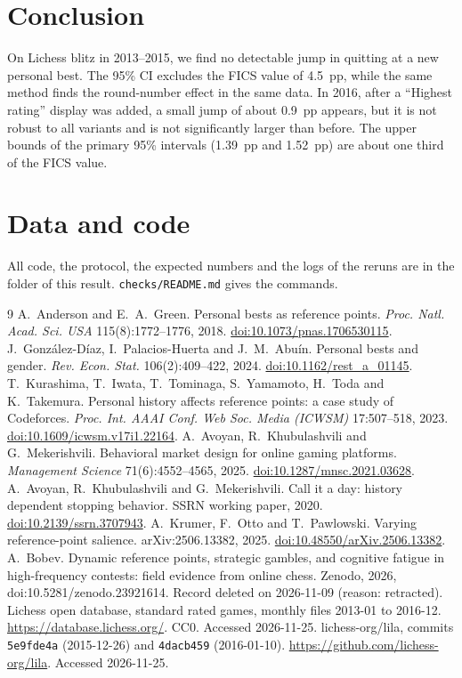 \documentclass[11pt]{article}
\begin{document}
\section{Conclusion}

On Lichess blitz in 2013--2015, we find no detectable jump in quitting at a new personal best. The 95\% CI excludes the FICS value of 4.5~pp, while the same method finds the round-number effect in the same data. In 2016, after a ``Highest rating'' display was added, a small jump of about 0.9~pp appears, but it is not robust to all variants and is not significantly larger than before. The upper bounds of the primary 95\% intervals (1.39~pp and 1.52~pp) are about one third of the FICS value.

\section*{Data and code}

All code, the protocol, the expected numbers and the logs of the reruns are in the folder of this result. \texttt{checks/README.md} gives the commands.

\begin{thebibliography}{9}
 A.~Anderson and E.~A.~Green. Personal bests as reference points. \emph{Proc. Natl. Acad. Sci. USA} 115(8):1772--1776, 2018. \href{https://doi.org/10.1073/pnas.1706530115}{doi:10.1073/pnas.1706530115}.
 J.~González-Díaz, I.~Palacios-Huerta and J.~M.~Abuín. Personal bests and gender. \emph{Rev. Econ. Stat.} 106(2):409--422, 2024. \href{https://doi.org/10.1162/rest_a_01145}{doi:10.1162/rest\_a\_01145}.
 T.~Kurashima, T.~Iwata, T.~Tominaga, S.~Yamamoto, H.~Toda and K.~Takemura. Personal history affects reference points: a case study of Codeforces. \emph{Proc. Int. AAAI Conf. Web Soc. Media (ICWSM)} 17:507--518, 2023. \href{https://doi.org/10.1609/icwsm.v17i1.22164}{doi:10.1609/icwsm.v17i1.22164}.
 A.~Avoyan, R.~Khubulashvili and G.~Mekerishvili. Behavioral market design for online gaming platforms. \emph{Management Science} 71(6):4552--4565, 2025. \href{https://doi.org/10.1287/mnsc.2021.03628}{doi:10.1287/mnsc.2021.03628}.
 A.~Avoyan, R.~Khubulashvili and G.~Mekerishvili. Call it a day: history dependent stopping behavior. SSRN working paper, 2020. \href{https://doi.org/10.2139/ssrn.3707943}{doi:10.2139/ssrn.3707943}.
 A.~Krumer, F.~Otto and T.~Pawlowski. Varying reference-point salience. arXiv:2506.13382, 2025. \href{https://doi.org/10.48550/arXiv.2506.13382}{doi:10.48550/arXiv.2506.13382}.
 A.~Bobev. Dynamic reference points, strategic gambles, and cognitive fatigue in high-frequency contests: field evidence from online chess. Zenodo, 2026, doi:10.5281/zenodo.23921614. Record deleted on 2026-11-09 (reason: retracted).
 Lichess open database, standard rated games, monthly files 2013-01 to 2016-12. \url{https://database.lichess.org/}. CC0. Accessed 2026-11-25.
 lichess-org/lila, commits \texttt{5e9fde4a} (2015-12-26) and \texttt{4dacb459} (2016-01-10). \url{https://github.com/lichess-org/lila}. Accessed 2026-11-25.
\end{thebibliography}
\end{document}
